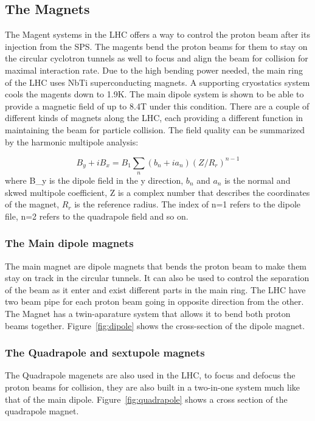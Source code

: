 \subsection{The Magnets}
The Magent systems in the LHC offers a way to control the proton beam after its injection from the SPS. The magents bend the proton beams for them to stay on the circular cyclotron tunnels as well to focus and align the beam for collision for maximal interaction rate. Due to the high bending power needed, the main ring of the LHC uses NbTi superconducting magnets.  A supporting cryostatics system cools the magents down to 1.9K. The main dipole system is shown to be able to provide a magnetic field of up to 8.4T under this condition. There are a couple of different kinds of magnets along the
LHC, each providing a different function in maintaining the beam for particle collision. The field quality can be summarized by the harmonic multipole analysis: 

\[ B_y+ iB_x  = B_1\sum_n(b_{n} + i a_{n})(Z/R_{r})^{n-1}\]
where B_y is the dipole field in the y direction, $b_{n}$ and $a_n$ is the normal and skwed multipole coefficient, Z is a complex number that describes the coordinates of the magnet, $R_{r}$ is the reference radius. The index of n=1 refers to the dipole file, n=2  refers to the quadrapole field and so on. 


\subsubsection{The Main dipole magnets}
The main magnet are dipole magnets that bends the proton beam to make them stay on track in the circular tunnels. It can also be used to control the separation of the beam as it enter and exist different parts in the main ring. 
The LHC have two beam pipe for each proton beam going in opposite direction from the other. The Magnet has a twin-aparature system that allows it to bend both proton beams together. Figure~\ref{fig:dipole} shows the cross-section of the dipole magnet. 



\subsubsection{The Quadrapole and sextupole magnets}
The Quadrapole magenets are also used in the LHC, to focus and defocus the proton beams for collision, they are also built in a two-in-one system much like that of the main dipole. Figure~\ref{fig:quadrapole} shows a cross section of the quadrapole magnet. 

